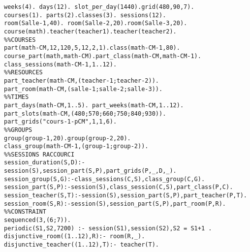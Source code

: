 \begin{lstlisting}[style=PrologStyle, caption={Donnée ASP}, label={lst:data-asp}]
weeks(4). days(12). slot_per_day(1440).grid(480,90,7).
courses(1). parts(2).classes(3). sessions(12).
room(Salle-1,40). room(Salle-2,20).room(Salle-3,20). 
course(math).teacher(teacher1).teacher(teacher2).
%%COURSES
part(math-CM,12,120,5,12,2,1).class(math-CM-1,80).
course_part(math,math-CM).part_class(math-CM,math-CM-1).
class_sessions(math-CM-1,1..12).
%%RESOURCES
part_teacher(math-CM,(teacher-1;teacher-2)).
part_room(math-CM,(salle-1;salle-2;salle-3)).
%%TIMES
part_days(math-CM,1..5). part_weeks(math-CM,1..12).
part_slots(math-CM,(480;570;660;750;840;930)).
part_grids("cours-1-pCM",1,1,6).
%%GROUPS
group(group-1,20).group(group-2,20).
class_group(math-CM-1,(group-1;group-2)).
%%SESSIONS RACCOURCI
session_duration(S,D):-session(S),session_part(S,P),part_grids(P,_,D,_).
session_group(S,G):-class_sessions(C,S),class_group(C,G).
session_part(S,P):-session(S),class_session(C,S),part_class(P,C).
session_teacher(S,T):-session(S),session_part(S,P),part_teacher(P,T).
session_room(S,R):-session(S),session_part(S,P),part_room(P,R).
%%CONSTRAINT
sequenced(3,(6;7)).
periodic(S1,S2,7200) :- session(S1),session(S2),S2 = S1+1 .
disjunctive_room((1..12),R):- room(R,_).
disjunctive_teacher((1..12),T):- teacher(T).
\end{lstlisting}
